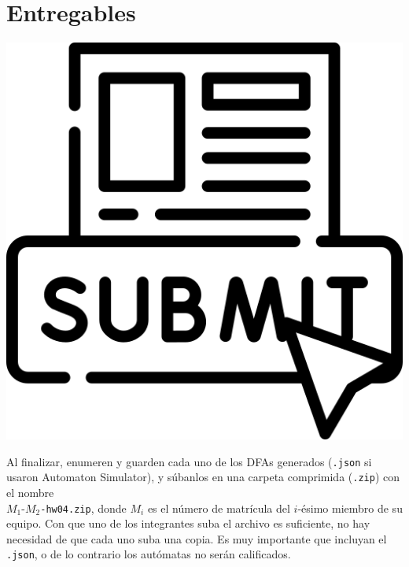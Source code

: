\documentclass[]{book}
\theoremstyle{definition}
\begin{document}
\section*{Entregables}

\begin{minipage}{0.1\linewidth}
	\centering
	\includegraphics[scale = 0.06]{../img/submit}
\end{minipage}%
\begin{minipage}{0.85\linewidth}
	Al finalizar, enumeren y guarden cada uno de los DFAs generados (\texttt{.json} si usaron Automaton Simulator), y súbanlos en una carpeta comprimida (\texttt{.zip}) con el nombre\\$M_1$-$M_2$\texttt{-hw04.zip}, donde $M_i$ es el número de matrícula del $i$-ésimo miembro de su equipo.
	Con que uno de los integrantes suba el archivo es suficiente, no hay necesidad de que cada uno suba una copia.
	Es muy importante que incluyan el \texttt{.json}, o de lo contrario los autómatas no serán calificados.
\end{minipage}

\vfill
\end{document}
